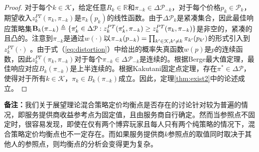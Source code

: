 \begin{proof}
对于每个$k\in\mathcal{K}$，给定任意$R_k\in \mathbb{R}$和$\pi_{-k}\in\Delta\mathcal{P}_{-k}$，对于每个价格$p_k\in\mathcal{P}_k$，期望收入$z_{k}^{PT}(\pi_k, \pi_{-k})$是$\pi_k(p_k)$的线性函数。由于$\Delta\mathcal{P}_{k}$是紧凑集合，因此最佳响应策略集$\bold{B}_k(\pi_{-k})\triangleq\{\pi'_k\in\Delta\mathcal{P}:z_{k}^{PT}(\pi'_k, \pi_{-k})\geq z_{k}^{PT}(\pi_k, \pi_{-k})\}$是非空的，紧凑的且凸的。注意到$\pi_{-k}$是通过$w(\cdot)$以$\pi_{-k}(p_{-k})=\prod_{k'\in\mathcal{K}, k'\neq k}\pi_{k'}(p_{k'})$的形式引入到$z_{k}^{PT}(\cdot)$ 。由于式（\ref{eq:distortion}）中给出的概率失真函数$w(p)$是$p$的连续函数，因此$z_{k}^{PT}(\pi_k, \pi_{-k})$对于每个$\pi_{-k}\in\Delta\mathcal{P}_{-k}$是连续的。根据Berge最大值定理，最佳响应对应$B_k(\pi_{-k})$是上半连续的。根据Kakutani固定点定理，存在$\pi^*\in\Delta\mathcal{P}$，使得对于所有$k\in\mathcal{K}$，$\pi_k\in B_k(\pi_{-k})$成立。因此，定理\ref{thm:exist2}中的论述成立。
\end{proof}


\noindent\textbf{备注：}我们关于展望理论混合策略定价均衡点是否存在的讨论针对较为普遍的情况，即服务提供商收益参考点为固定值，且由服务商自行确定。然而当参照点不固定时，很容易发现，即使在仅有两个博弈玩家且每人只有两个纯策略的情况下，混合策略定价均衡点也不一定存在。而如果服务提供商$k$参照点的取值同时取决于其他人的参照点，则均衡点的分析会变得更为复杂。

